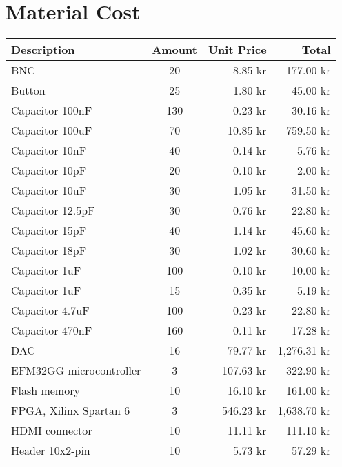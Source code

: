 \chapter{Material Cost}
\label{tbl:material-cost}
\begin{longtable}{|l|c|r|r|}
    \hline
    \textbf{Description}    & \textbf{Amount} & \textbf{Unit Price} & \textbf{Total}       \\ \hline
    BNC                     & 20     & 8.85 kr    & 177.00 kr   \\ \hline
    Button                  & 25     & 1.80 kr    & 45.00 kr    \\ \hline
    Capacitor 100nF         & 130    & 0.23 kr    & 30.16 kr    \\ \hline
    Capacitor 100uF         & 70     & 10.85 kr   & 759.50 kr   \\ \hline
    Capacitor 10nF          & 40     & 0.14 kr    & 5.76 kr     \\ \hline
    Capacitor 10pF          & 20     & 0.10 kr    & 2.00 kr     \\ \hline
    Capacitor 10uF          & 30     & 1.05 kr    & 31.50 kr    \\ \hline
    Capacitor 12.5pF        & 30     & 0.76 kr    & 22.80 kr    \\ \hline
    Capacitor 15pF          & 40     & 1.14 kr    & 45.60 kr    \\ \hline
    Capacitor 18pF          & 30     & 1.02 kr    & 30.60 kr    \\ \hline
    Capacitor 1uF           & 100    & 0.10 kr    & 10.00 kr    \\ \hline
    Capacitor 1uF           & 15     & 0.35 kr    & 5.19 kr     \\ \hline
    Capacitor 4.7uF         & 100    & 0.23 kr    & 22.80 kr    \\ \hline
    Capacitor 470nF         & 160    & 0.11 kr    & 17.28 kr    \\ \hline
    DAC                     & 16     & 79.77 kr   & 1,276.31 kr \\ \hline
    EFM32GG microcontroller & 3      & 107.63 kr  & 322.90 kr   \\ \hline
    Flash memory            & 10     & 16.10 kr   & 161.00 kr   \\ \hline
    FPGA, Xilinx Spartan 6  & 3      & 546.23 kr  & 1,638.70 kr \\ \hline
    HDMI connector          & 10     & 11.11 kr   & 111.10 kr   \\ \hline
    Header 10x2-pin         & 10     & 5.73 kr    & 57.29 kr    \\ \hline

\end{longtable}
